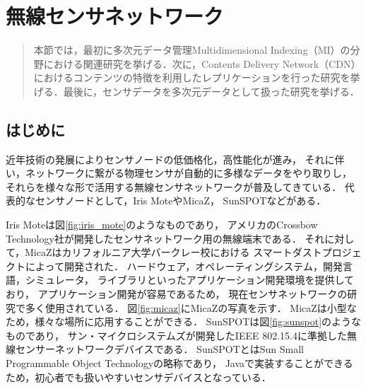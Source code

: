 \chapter{無線センサネットワーク}
\begin{large}
\begin{quote}
本節では，最初に多次元データ管理Multidimensional Indexing（MI）の分野における関連研究を挙げる．次に，Contents Delivery Network（CDN）におけるコンテンツの特徴を利用したレプリケーションを行った研究を挙げる．最後に，センサデータを多次元データとして扱った研究を挙げる．
\end{quote}
\end{large}
\clearpage

\section{はじめに}
近年技術の発展によりセンサノードの低価格化，高性能化が進み，
それに伴い，ネットワークに繋がる物理センサが自動的に多様なデータをやり取りし，
それらを様々な形で活用する無線センサネットワークが普及してきている．
代表的なセンサノードとして，Iris MoteやMicaZ\cite{Hill:2002:MWP:623308.624560}，
SunSPOTなどがある．

Iris Moteは図\ref{fig:iris_mote}のようなものであり，
アメリカのCrossbow Technology社が開発したセンサネットワーク用の無線端末である．
それに対して，MicaZはカリフォルニア大学バークレー校における
スマートダストプロジェクト\cite{Kahn:1999:NCC:313451.313558}によって開発された．
ハードウェア，オペレーティングシステム，開発言語，シミュレータ，
ライブラリといったアプリケーション開発環境を提供しており，
アプリケーション開発が容易であるため，
現在センサネットワークの研究で多く使用されている．
図\ref{fig:micaz}にMicaZの写真を示す．
MicaZは小型なため，様々な場所に応用することができる．
SunSPOTは図\ref{fig:sunspot}のようなものであり，
サン・マイクロシステムズが開発したIEEE 802.15.4に準拠した無線センサーネットワークデバイスである．
SunSPOTとはSun Small Programmable Object Technologyの略称であり，
Javaで実装することができるため，初心者でも扱いやすいセンサデバイスとなっている．


